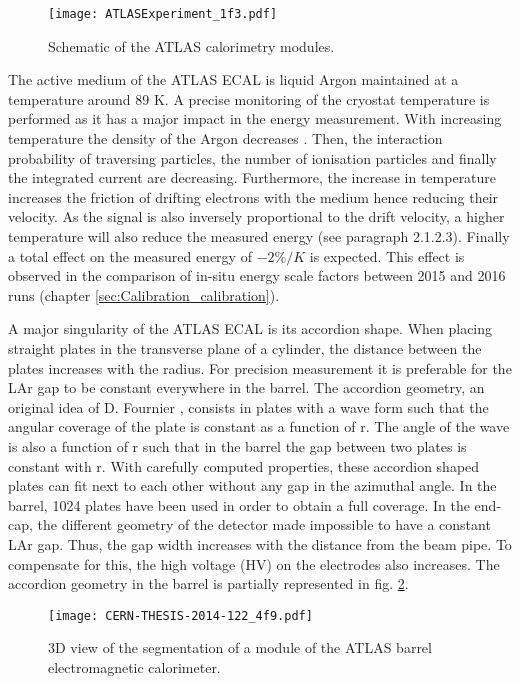 \begin{figure}[htbp]
\centering
\texttt{[image: ATLASExperiment\_1f3.pdf]}
\caption{\label{fig:orge5c6ca3}
Schematic of the ATLAS calorimetry modules.\cite{ATLASExperiment}}
\end{figure}

The active medium of the ATLAS ECAL is liquid Argon maintained at a temperature around 89 K.
A precise monitoring of the cryostat temperature is performed as it has a major impact in the energy measurement.
With increasing temperature the density of the Argon decreases \cite{VANITTERBEEK1960931}.
Then, the interaction probability of traversing particles, the number of ionisation particles and finally the integrated current are decreasing.
Furthermore, the increase in temperature increases the friction of drifting electrons with the medium hence reducing their velocity.
As the signal is also inversely proportional to the drift velocity, a higher temperature will also reduce the measured energy (see \cite{ATLAS-TDR-2} paragraph 2.1.2.3).
Finally a total effect on the measured energy of \(-2\%/K\) is expected.
This effect is observed in the comparison of in-situ energy scale factors between 2015 and 2016 runs (chapter \ref{sec:Calibration_calibration}).

A major singularity of the ATLAS ECAL is its accordion shape.
When placing straight plates in the transverse plane of a cylinder, the distance between the plates increases with the radius.
For precision measurement it is preferable for the LAr gap to be constant everywhere in the barrel.
The accordion geometry, an original idea of D. Fournier \cite{fournier:in2p3-00020706},  consists in plates with a wave form such that the angular coverage of the plate is constant as a function of r.
The angle of the wave is also a function of r such that in the barrel the gap between two plates is constant with r.
With carefully computed properties, these accordion shaped plates can fit next to each other without any gap in the azimuthal angle.
In the barrel, 1024 plates have been used in order to obtain a full coverage.
In the end-cap, the different geometry of the detector made impossible to have a constant LAr gap.
Thus, the gap width increases with the distance from the beam pipe.
To compensate for this, the high voltage (HV) on the electrodes also increases.
The accordion geometry in the barrel is partially represented in fig. \ref{fig:org246373c}.

\begin{figure}[htbp]
\centering
\texttt{[image: CERN-THESIS-2014-122\_4f9.pdf]}
\caption{\label{fig:org246373c}
3D view of the segmentation of a module of the ATLAS barrel electromagnetic calorimeter.\cite{CERN-THESIS-2014-122}}
\end{figure}

